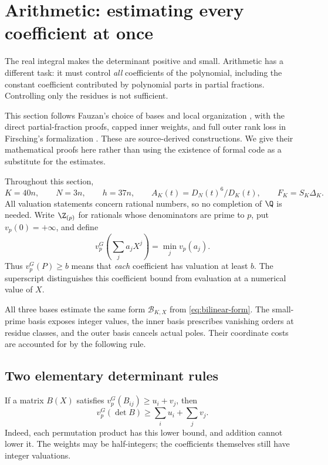 \section{Arithmetic: estimating every coefficient at once}\label{sec:local-arithmetic}

The real integral makes the determinant positive and small. Arithmetic has
a different task: it must control \emph{all} coefficients of the polynomial,
including the constant coefficient contributed by polynomial parts in
partial fractions. Controlling only the residues is not sufficient.

This section follows Fauzan's choice of bases and local organization
\cite[\S\S3--4]{fauzan}, with the direct partial-fraction proofs, capped
inner weights, and full outer rank loss in Firsching's formalization
\cite[\texttt{Apery/Arith/} and \texttt{Norm.lean}]{firsching}.
These are source-derived constructions. We give their mathematical
proofs here rather than using the existence of formal code as a substitute
for the estimates.

Throughout this section,
\[
 K=40n,\qquad N=3n,\qquad h=37n,\qquad
 A_K(t)=D_N(t)^6/D_K(t),\qquad F_K=S_K\Delta_K.
\]
All valuation statements concern rational numbers, so no completion of
$\Q$ is needed. Write $\Z_{(p)}$ for rationals whose denominators are
prime to $p$, put $v_p(0)=+\infty$, and define
\[
 v_p^G\!\left(\sum_j a_jX^j\right)=\min_j v_p(a_j).
\]
Thus $v_p^G(P)\ge b$ means that \emph{each} coefficient has valuation
at least $b$. The superscript distinguishes this coefficient bound from
evaluation at a numerical value of $X$.

All three bases estimate the same form \(\mathcal B_{K,X}\) from
\eqref{eq:bilinear-form}. The small-prime basis exposes integer values,
the inner basis prescribes vanishing orders at residue classes, and
the outer basis cancels actual poles. Their coordinate costs are
accounted for by the following rule.

\subsection{Two elementary determinant rules}

If a matrix $B(X)$ satisfies
$v_p^G(B_{ij})\ge u_i+v_j$, then
\begin{equation}\label{arith:detweights}
 v_p^G(\det B)\ge\sum_i u_i+\sum_j v_j.
\end{equation}
Indeed, each permutation product has this lower bound, and addition
cannot lower it. The weights may be half-integers; the coefficients
themselves still have integer valuations.

